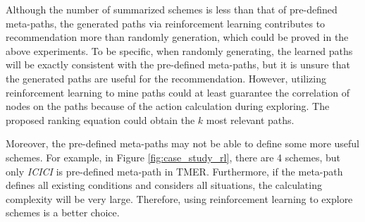 Although the number of summarized schemes is less than that of pre-defined meta-paths, the generated paths via reinforcement learning contributes to recommendation more than randomly generation, which could be proved in the above experiments. To be specific, when randomly generating, the learned paths will be exactly consistent with the pre-defined meta-paths, but it is unsure that the generated paths are useful for the recommendation. However, utilizing reinforcement learning to mine paths could at least guarantee the correlation of nodes on the paths because of the action calculation during exploring. The proposed ranking equation could obtain the $k$ most relevant paths.

Moreover, the pre-defined meta-paths may not be able to define some more useful schemes. For example, in Figure \ref{fig:case_study_rl}, there are 4 schemes, but only \textit{ICICI} is pre-defined meta-path in TMER. Furthermore, if the meta-path defines all existing conditions and considers all situations, the calculating complexity will be very large. Therefore, using reinforcement learning to explore schemes is a better choice.